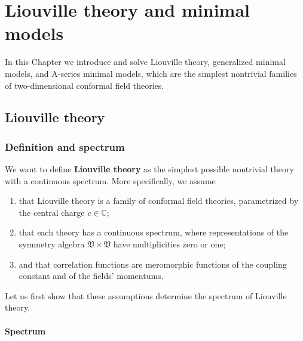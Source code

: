 \documentclass[12pt, a4paper, notitlepage, twoside]{report}
\numberwithin{equation}{section}
\theoremstyle{break}
\begin{document}
\cleardoublepage

\chapter{Liouville theory and minimal models \label{seccbm}}

In this Chapter we introduce and solve Liouville theory, generalized minimal models, and A-series minimal models, which are the simplest nontrivial families of two-dimensional conformal field theories. 

\section{Liouville theory \label{secliou}}

\subsection{Definition and spectrum \label{secspe}}

We want to define \textbf{Liouville theory} as the simplest possible nontrivial theory with a continuous spectrum. More specifically, we assume
\begin{enumerate}
 \item that Liouville theory is a family of conformal field theories, parametrized by the central charge $c\in\mathbb{C}$;
\item that each theory has a continuous spectrum, where representations of the symmetry algebra $\mathfrak{V}\times\overline{\mathfrak{V}}$ have multiplicities zero or one;
\item and that correlation functions are meromorphic functions of the coupling constant and of the fields' momentums.
\end{enumerate}
Let us first show that these assumptions determine the spectrum of Liouville theory.

\subsubsection{Spectrum}
\end{document}
